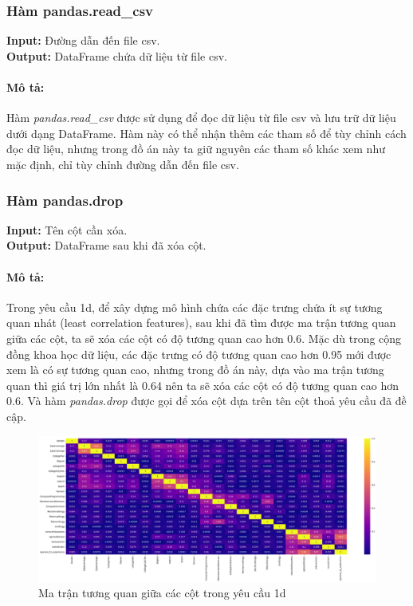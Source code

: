 \documentclass[]{article}
\begin{document}
\subsubsection{Hàm pandas.read\_csv}
\noindent
\textbf{Input:} Đường dẫn đến file csv. \\
\textbf{Output:} DataFrame chứa dữ liệu từ file csv.
\paragraph{Mô tả:}

Hàm \textit{pandas.read\_csv} \cite{pandasreadcsv} được sử dụng để đọc dữ liệu từ file csv và lưu trữ dữ liệu dưới dạng DataFrame. Hàm này có thể nhận thêm các tham số để tùy chỉnh cách đọc dữ liệu, nhưng trong đồ án này ta giữ nguyên các tham số khác xem như mặc định, chỉ tùy chỉnh đường dẫn đến file csv.

\subsubsection{Hàm pandas.drop}
\noindent
\textbf{Input:} Tên cột cần xóa. \\
\textbf{Output:} DataFrame sau khi đã xóa cột.

\paragraph{Mô tả:}
Trong yêu cầu 1d, để xây dựng mô hình chứa các đặc trưng chứa ít sự tương quan nhát (least correlation features), sau khi đã tìm được ma trận tương quan giữa các cột, ta sẽ xóa các cột có độ tương quan cao hơn 0.6. Mặc dù trong cộng đồng khoa học dữ liệu, các đặc trưng có độ tương quan cao hơn 0.95 mới được xem là có sự tương quan cao, nhưng trong đồ án này, dựa vào ma trận tương quan thì giá trị lớn nhất là 0.64 nên ta sẽ xóa các cột có độ tương quan cao hơn 0.6. Và hàm \textit{pandas.drop} \cite{pydataPandasDataFramedrop} được gọi để xóa cột dựa trên tên cột thoả yêu cầu đã đề cập.

\begin{figure}[!h]
    \centering
    \includegraphics[width=\textwidth]{image/heatmap.png}
    \caption{Ma trận tương quan giữa các cột trong yêu cầu 1d}
    \label{fig:1d_corr}
\end{figure}
\end{document}
